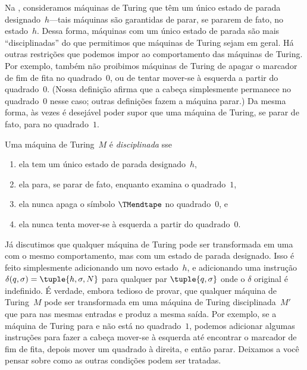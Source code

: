 \documentclass[../../../include/open-logic-section]{subfiles}
\begin{document}

\begin{explain}
Na , consideramos máquinas de Turing que têm um
único estado de parada designado~$h$---tais máquinas são garantidas de
parar, se pararem de fato, no estado~$h$. Dessa forma, máquinas com um
único estado de parada são mais ``disciplinadas'' do que permitimos que
máquinas de Turing sejam em geral. Há outras restrições que podemos
impor ao comportamento das máquinas de Turing. Por exemplo, também não
proibimos máquinas de Turing de apagar o marcador de fim de fita
no quadrado~$0$, ou de tentar mover-se à esquerda a partir do quadrado~$0$. (Nossa
definição afirma que a cabeça simplesmente permanece no quadrado~$0$ nesse
caso; outras definições fazem a máquina parar.) Da mesma forma, às vezes é
desejável poder supor que uma máquina de Turing, se
parar de fato, para no quadrado~$1$.
\end{explain}

\begin{defn}
Uma máquina de Turing~$M$ é \emph{disciplinada} sse
\begin{enumerate}
    \item ela tem um único estado de parada designado~$h$,
    \item ela para, se parar de fato, enquanto examina o quadrado~$1$,
    \item ela nunca apaga o símbolo $\TMendtape$ no quadrado~$0$, e
    \item ela nunca tenta mover-se à esquerda a partir do quadrado~$0$.
\end{enumerate}
\end{defn}

\begin{explain}
Já discutimos que qualquer máquina de Turing pode ser transformada em
uma com o mesmo comportamento, mas com um estado de parada designado. Isso é
feito simplesmente adicionando um novo estado~$h$, e adicionando uma instrução
$\delta(q, \sigma) = \tuple{h, \sigma, N}$ para qualquer par
$\tuple{q,\sigma}$ onde o $\delta$ original é indefinido. É
verdade, embora tedioso de provar, que qualquer máquina de Turing~$M$ pode ser
transformada em uma máquina de Turing disciplinada~$M'$ que para nas mesmas
entradas e produz a mesma saída. Por exemplo, se a máquina de Turing
para e não está no quadrado~$1$, podemos adicionar algumas instruções
para fazer a cabeça mover-se à esquerda até encontrar o marcador de fim de fita, depois
mover um quadrado à direita, e então parar. Deixamos a você pensar
sobre como as outras condições podem ser tratadas.
\end{explain}
\end{document}
